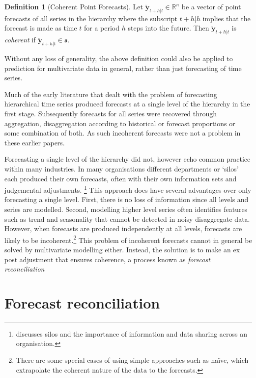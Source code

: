 \documentclass[12pt]{article}
\theoremstyle{definition}
\newtheorem{definition}{Definition}[section]
\begin{document}
	\begin{definition}[Coherent Point Forecasts]\label{def:cohpoint}
        Let $\breve{\bm{y}}_{t+h|t} \in \mathbb{R}^n$ be a vector of point forecasts of all series in the hierarchy where the subscript $t+h|h$ implies that the forecast is made as time $t$ for a period $h$ steps into the future. Then $\breve{\bm{y}}_{t+h|t}$ is \emph{coherent} if $\breve{\bm{y}}_{t+h|t} \in \mathfrak{s}$.
	\end{definition}

    Without any loss of generality, the above definition could also be applied to prediction for multivariate data in general, rather than just forecasting of time series.


    Much of the early literature that dealt with the problem of forecasting hierarchical time series \citep[see][and references therein]{Gross1990} produced forecasts at a single level of the hierarchy in the first stage. Subsequently forecasts for all series were recovered through aggregation, disaggregation according to historical or forecast proportions or some combination of both.  As such incoherent forecasts were not a problem in these earlier papers.

    Forecasting a single level of the hierarchy did not, however echo common practice within many industries. In many organisations different departments or `silos' each produced their own forecasts, often with their own information sets and judgemental adjustments. \footnote{\cite{Cha2013} discusses silos and the importance of information and data sharing across an organisation.}  This approach does have several advantages over only forecasting a single level.  First, there is no loss of information since all levels and series are modelled.  Second, modelling higher level series often identifies features such as trend and seasonality that cannot be detected in noisy disaggregate data.  However, when forecasts are produced independently at all levels, forecasts are likely to be incoherent.\footnote{There are some special cases of using simple approaches such as na\"{i}ve, which extrapolate the coherent nature of the data to the forecasts.} This problem of incoherent forecasts cannot in general be solved by multivariate modelling either.  Instead, the solution is to make an ex post adjustment that ensures coherence, a process known as {\em forecast reconciliation}
	
	
	
\section{Forecast reconciliation}\label{sec:Reconciliation}
	
\end{document}
